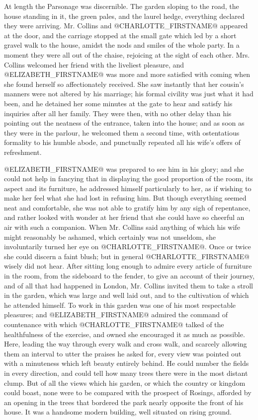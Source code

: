 At length the Parsonage was discernible. The garden sloping to the
road, the house standing in it, the green pales, and the laurel hedge,
everything declared they were arriving. Mr. Collins and @CHARLOTTE_FIRSTNAME@
appeared at the door, and the carriage stopped at the small gate which
led by a short gravel walk to the house, amidst the nods and smiles of
the whole party. In a moment they were all out of the chaise, rejoicing
at the sight of each other. Mrs. Collins welcomed her friend with the
liveliest pleasure, and @ELIZABETH_FIRSTNAME@ was more and more satisfied with
coming when she found herself so affectionately received. She saw
instantly that her cousin's manners were not altered by his marriage;
his formal civility was just what it had been, and he detained her some
minutes at the gate to hear and satisfy his inquiries after all her
family. They were then, with no other delay than his pointing out the
neatness of the entrance, taken into the house; and as soon as they
were in the parlour, he welcomed them a second time, with ostentatious
formality to his humble abode, and punctually repeated all his wife's
offers of refreshment.

@ELIZABETH_FIRSTNAME@ was prepared to see him in his glory; and she could not help
in fancying that in displaying the good proportion of the room, its
aspect and its furniture, he addressed himself particularly to her,
as if wishing to make her feel what she had lost in refusing him. But
though everything seemed neat and comfortable, she was not able to
gratify him by any sigh of repentance, and rather looked with wonder at
her friend that she could have so cheerful an air with such a companion.
When Mr. Collins said anything of which his wife might reasonably be
ashamed, which certainly was not unseldom, she involuntarily turned her
eye on @CHARLOTTE_FIRSTNAME@. Once or twice she could discern a faint blush; but
in general @CHARLOTTE_FIRSTNAME@ wisely did not hear. After sitting long enough to
admire every article of furniture in the room, from the sideboard to
the fender, to give an account of their journey, and of all that had
happened in London, Mr. Collins invited them to take a stroll in the
garden, which was large and well laid out, and to the cultivation of
which he attended himself. To work in this garden was one of his most
respectable pleasures; and @ELIZABETH_FIRSTNAME@ admired the command of countenance
with which @CHARLOTTE_FIRSTNAME@ talked of the healthfulness of the exercise, and
owned she encouraged it as much as possible. Here, leading the way
through every walk and cross walk, and scarcely allowing them an
interval to utter the praises he asked for, every view was pointed out
with a minuteness which left beauty entirely behind. He could number the
fields in every direction, and could tell how many trees there were in
the most distant clump. But of all the views which his garden, or which
the country or kingdom could boast, none were to be compared with the
prospect of Rosings, afforded by an opening in the trees that bordered
the park nearly opposite the front of his house. It was a handsome
modern building, well situated on rising ground.

